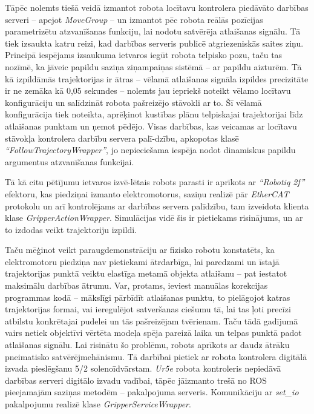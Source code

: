 \documentclass[12pt, a4paper]{article}
\numberwithin{equation}{section} %
\begin{document}
Tāpēc nolemts tiešā veidā izmantot robota locītavu kontrolera piedāvāto darbības serveri -- apejot \textit{MoveGroup} -- un izmantot pēc robota reālās pozīcijas parametrizētu atzvanīšanas funkciju, lai nodotu satvērēja atlaišanas signālu. Tā tiek izsaukta katru reizi, kad darbības serveris publicē atgriezeniskās saites ziņu. Principā iespējams izsaukuma ietvaros iegūt robota telpisko pozu, taču tas nozīmē, ka jāveic papildu saziņa ziņampaiņas sistēmā -- ar papildu aizturēm. Tā kā izpildāmās trajektorijas ir ātras -- vēlamā atlaišanas signāla izpildes precizitāte ir ne zemāka kā 0,05 sekundes -- nolemts jau iepriekš noteikt vēlamo locītavu konfigurāciju un salīdzināt robota pašreizējo stāvokli ar to. Šī vēlamā konfigurācija tiek noteikta, aprēķinot kustības plānu telpiskajai trajektorijai līdz atlaišanas punktam un ņemot pēdējo. Visas darbības, kas veicamas ar locītavu stāvokļa kontrolera darbību servera palī-dzību, apkopotas klasē \textit{``FollowTrajectoryWrapper''}, jo nepieciešama iespēja nodot dinamiskus papildu argumentus atzvanīšanas funkcijai. 

Tā kā citu pētījumu ietvaros izvē-lētais robots parasti ir aprīkots ar \textit{``Robotiq 2f''} efektoru, kas piedziņai izmanto elektromotorus, saziņu realizē pār \textit{EtherCAT} protokolu un arī kontrolējams ar darbības servera palīdzību, tam izveidota klienta klase \textit{GripperActionWrapper}. Simulācijas vidē šis ir pietiekams risinājums, un ar to izdodas veikt trajektoriju izpildi.

Taču mēģinot veikt paraugdemonstrāciju ar fizisko robotu konstatēts, ka elektromotoru piedziņa nav pietiekami ātrdarbīga, lai paredzami un īstajā trajektorijas punktā veiktu elastīga metamā objekta atlaišanu -- pat iestatot maksimālu darbības ātrumu. Var, protams, ieviest manuālas korekcijas programmas kodā -- mākslīgi pārbīdīt atlaišanas punktu, to pielāgojot katras trajektorijas formai, vai ieregulējot satveršanas ciešumu tā, lai tas ļoti precīzi atbilstu konkrētajai pudelei un tās pašreizējam tvērienam. Taču tādā gadījumā vairs netiek objektīvi vērtēta modeļa spēja pareizā laika un telpas punktā padot atlaišanas signālu. Lai risinātu šo problēmu, robots aprīkots ar daudz ātrāku pneimatisko satvērējmehānismu. Tā darbībai pietiek ar robota kontrolera digitālā izvada pieslēgšanu 5/2 solenoīdvārstam. \textit{Ur5e} robota kontroleris nepiedāvā darbības serveri digitālo izvadu vadībai, tāpēc jāizmanto trešā no ROS pieejamajām saziņas metodēm -- pakalpojuma serveris. Komunikāciju ar \textit{set\_io} pakalpojumu realizē klase \textit{GripperServiceWrapper}.
\end{document}
